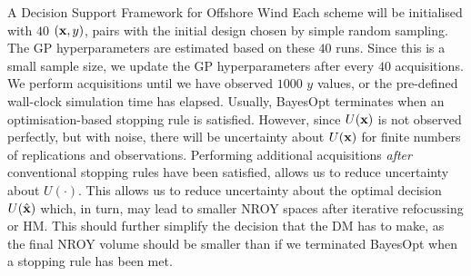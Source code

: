 \begin{chapter}{A Decision Support Framework for Offshore Wind \label{Ch:ds-for-ow}}
Each scheme will be initialised with $40$ $(\mathbf{x}, y)$, pairs with the initial design chosen by simple random sampling. The GP hyperparameters are estimated based on these $40$ runs. Since this is a small sample size, we update the GP hyperparameters after every $40$ acquisitions. We perform acquisitions until we have observed $1000$ $y$ values, or the pre-defined wall-clock simulation time has elapsed. Usually, BayesOpt terminates when an optimisation-based stopping rule is satisfied. However, since $U(\mathbf{x})$ is not observed perfectly, but with noise, there will be uncertainty about $U(\mathbf{x})$ for finite numbers of replications and observations. Performing additional acquisitions \textit{after} conventional stopping rules have been satisfied, allows us to reduce uncertainty about $U(\cdot)$. This allows us to reduce uncertainty about the optimal decision $U(\hat{\mathbf{x}})$ which, in turn, may lead to smaller NROY spaces after iterative refocussing or HM. This should further simplify the decision that the DM has to make, as the final NROY volume should be smaller than if we terminated BayesOpt when a stopping rule has been met.

\end{chapter}

